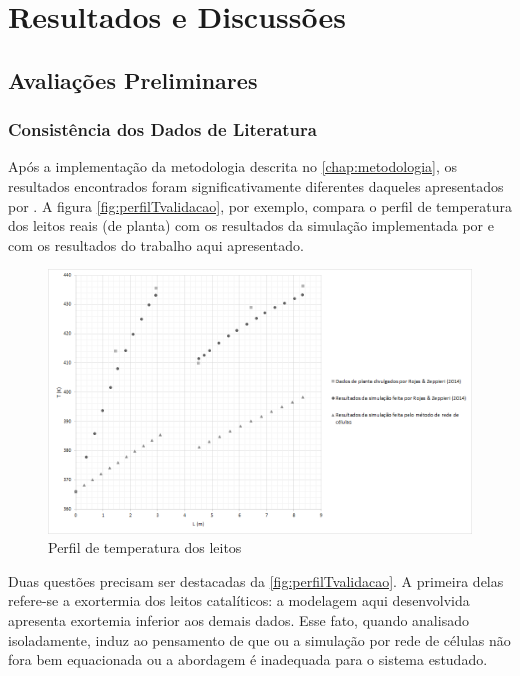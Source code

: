 %
% 
%
\chapter{Resultados e Discussões} \label{chap:resultados}

\section{Avaliações Preliminares} \label{sec:avaliacoesespreliminares}

\subsection{Consistência dos Dados de Literatura}
\label{sec:dadosliteratura}

Após a implementação da metodologia descrita no \autoref{chap:metodologia}, os
resultados encontrados foram significativamente diferentes daqueles apresentados
por . A figura \autoref{fig:perfilTvalidacao}, por
exemplo, compara o perfil de temperatura dos leitos reais (de planta) com os
resultados da simulação implementada por  e com os
resultados do trabalho aqui apresentado.

\begin{figure}[htb]
\centering \includegraphics[scale=0.4]{images/Chap4/perfilTvalidacao.png}
\caption{Perfil de temperatura dos leitos}
\label{fig:perfilTvalidacao}
\end{figure}

Duas questões precisam ser destacadas da \autoref{fig:perfilTvalidacao}.
A primeira delas refere-se a exortermia dos leitos catalíticos: a modelagem aqui
desenvolvida apresenta exortemia inferior aos demais dados. Esse fato, quando
analisado isoladamente, induz ao pensamento de que ou a simulação
por rede de células não fora bem equacionada ou a abordagem é inadequada para o
sistema estudado.

